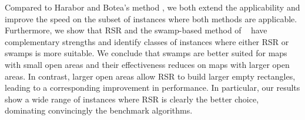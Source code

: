 Compared to Harabor and Botea's method , 
we both extend the applicability and improve the speed
on the subset of instances where both methods are applicable.
Furthermore, we show that RSR and the swamp-based method of 
\citeauthor{pochter10}~
have complementary strengths and identify classes of instances where
either RSR or swamps is more suitable.
We conclude that swamps are better suited for maps with
small open areas and their effectiveness reduces on maps with larger open areas.
In contrast, larger open areas allow RSR to build larger empty rectangles,
leading to a corresponding improvement in performance.
In particular, our results show a wide range of instances where
RSR is clearly the better choice, dominating convincingly the benchmark algorithms.

